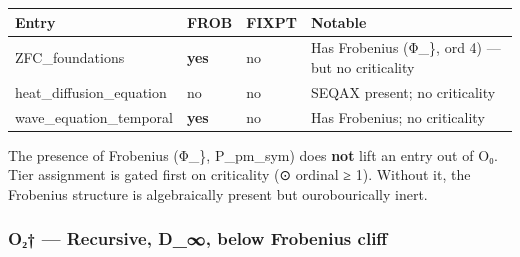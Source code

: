 {\def\LTcaptype{none} %
\begin{longtable}[]{@{}
  >{\raggedright\arraybackslash}p{}
  >{\raggedright\arraybackslash}p{}
  >{\raggedright\arraybackslash}p{}
  >{\raggedright\arraybackslash}p{}@{}}
\toprule\noalign{}
\begin{minipage}[b]{\linewidth}\raggedright
Entry
\end{minipage} & \begin{minipage}[b]{\linewidth}\raggedright
FROB
\end{minipage} & \begin{minipage}[b]{\linewidth}\raggedright
FIXPT
\end{minipage} & \begin{minipage}[b]{\linewidth}\raggedright
Notable
\end{minipage} \\
\midrule\noalign{}
\endhead
\bottomrule\noalign{}
\endlastfoot
ZFC\_foundations & \textbf{yes} & no & Has Frobenius (Φ\_\}, ord 4) ---
but no criticality \\
heat\_diffusion\_equation & no & no & SEQAX present; no criticality \\
wave\_equation\_temporal & \textbf{yes} & no & Has Frobenius; no
criticality \\
\end{longtable}
}

The presence of Frobenius (Φ\_\}, P\_pm\_sym) does \textbf{not} lift an
entry out of O₀. Tier assignment is gated first on criticality (⊙
ordinal ≥ 1). Without it, the Frobenius structure is algebraically
present but ourobourically inert.

\subsubsection{O₂† --- Recursive, D\_∞, below Frobenius
cliff}\label{oux2082-recursive-d_-below-frobenius-cliff}

